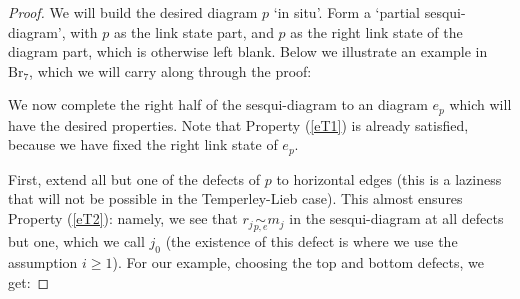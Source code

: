 \documentclass[12pt]{amsart}
\theoremstyle{plain}
\theoremstyle{definition} \newtheorem{definition}[theorem]{Definition}
\theoremstyle{plain}
\theoremstyle{plain} \newtheorem{proposition}[theorem]{Proposition}
\theoremstyle{plain} \newtheorem{conjecture}[theorem]{Conjecture}
\theoremstyle{plain} \newtheorem{corollary}[theorem]{Corollary}
\theoremstyle{remark} \newtheorem{claim}[theorem]{Claim}
\theoremstyle{remark} \newtheorem{remark}[theorem]{Remark}
\theoremstyle{remark} \newtheorem{example}[theorem]{Example}
\theoremstyle{remark} \newtheorem{comment}[theorem]{Comment}
\theoremstyle{definition} \newtheorem{question}[theorem]{Question}
\newcommand{\Brauer}{\mathrm{Br}}
\begin{document}
\begin{proof} We will build the desired diagram $p$ `in situ'. Form a `partial sesqui-diagram', with $p$ as the link state part, and $p$ as the right link state of the diagram part, which is otherwise left blank. Below we illustrate an example in $\Brauer_7$, which we will carry along through the proof:

\begin{center}
\quad
{}
\quad
\end{center}

We now complete the right half of the sesqui-diagram to an diagram $e_p$ which will have the desired properties. Note that Property (\ref{eT1}) is already satisfied, because we have fixed the right link state of $e_p$.

First, extend all but one of the defects of $p$ to horizontal edges (this is a laziness that will not be possible in the Temperley-Lieb case). This almost ensures Property (\ref{eT2}): namely, we see that $r_j \underset{p,e}{\sim} m_j$ in the sesqui-diagram at all defects but one, which we call $j_0$ (the existence of this defect is where we use the assumption $i \geq 1$). For our example, choosing the top and bottom defects, we get:


\end{proof}
\end{document}

